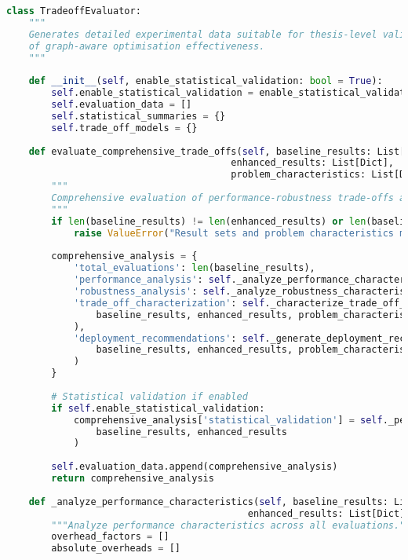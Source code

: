 \begin{lstlisting}[language=Python, caption=Multi-dimensional Trade-off Analysis and Characterisation]
class TradeoffEvaluator:
    """
    Generates detailed experimental data suitable for thesis-level validation 
    of graph-aware optimisation effectiveness.
    """
    
    def __init__(self, enable_statistical_validation: bool = True):
        self.enable_statistical_validation = enable_statistical_validation
        self.evaluation_data = []
        self.statistical_summaries = {}
        self.trade_off_models = {}
    
    def evaluate_comprehensive_trade_offs(self, baseline_results: List[Dict], 
                                        enhanced_results: List[Dict],
                                        problem_characteristics: List[Dict]) -> Dict:
        """
        Comprehensive evaluation of performance-robustness trade-offs across all test categories.
        """
        if len(baseline_results) != len(enhanced_results) or len(baseline_results) != len(problem_characteristics):
            raise ValueError("Result sets and problem characteristics must have matching lengths")
        
        comprehensive_analysis = {
            'total_evaluations': len(baseline_results),
            'performance_analysis': self._analyze_performance_characteristics(baseline_results, enhanced_results),
            'robustness_analysis': self._analyze_robustness_characteristics(baseline_results, enhanced_results),
            'trade_off_characterization': self._characterize_trade_off_relationships(
                baseline_results, enhanced_results, problem_characteristics
            ),
            'deployment_recommendations': self._generate_deployment_recommendations(
                baseline_results, enhanced_results, problem_characteristics
            )
        }
        
        # Statistical validation if enabled
        if self.enable_statistical_validation:
            comprehensive_analysis['statistical_validation'] = self._perform_statistical_validation(
                baseline_results, enhanced_results
            )
        
        self.evaluation_data.append(comprehensive_analysis)
        return comprehensive_analysis
    
    def _analyze_performance_characteristics(self, baseline_results: List[Dict], 
                                           enhanced_results: List[Dict]) -> Dict:
        """Analyze performance characteristics across all evaluations."""
        overhead_factors = []
        absolute_overheads = []
        

\end{lstlisting}
